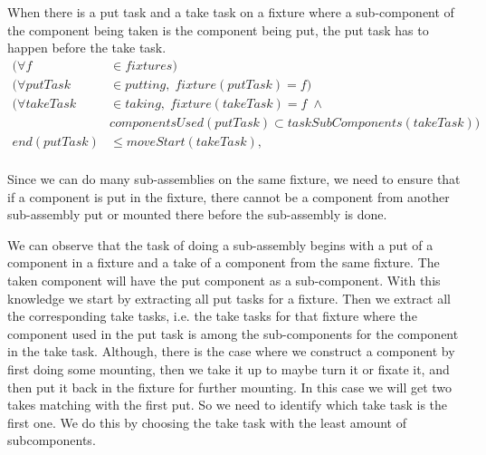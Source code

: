   \noindent When there is a put task and a take task on a fixture where a sub-component of the component being taken is the component being put, the put task has to happen before the take task.
 \begin{equation}
 \begin{aligned}\label{eq:99}
 (\forall f &\in fixtures) \\
 (\forall putTask &\in putting, \; fixture(putTask) = f)\\
 (\forall takeTask &\in taking, \; fixture(takeTask) = f \; \land \\
 &componentsUsed(putTask) \subset taskSubComponents(takeTask)) \\
 end(putTask) &\le moveStart(takeTask), \\
 \end{aligned}
 \end{equation}

  \noindent Since we can do many sub-assemblies on the same fixture, we need to ensure that if a component is put in the fixture, there cannot be a component from another sub-assembly put or mounted there before the sub-assembly is done.
  
  We can observe that the task of doing a sub-assembly begins with a put of a component in a fixture and a take of a component from the same fixture. The taken component will have the put component as a sub-component. With this knowledge we start by extracting all put tasks for a fixture. Then we extract all the corresponding take tasks, i.e. the take tasks for that fixture where the component used in the put task is among the sub-components for the component in the take task. Although, there is the case where we construct a component by first doing some mounting, then we take it up to maybe turn it or fixate it, and then put it back in the fixture for further mounting. In this case we will get two takes matching with the first put. So we need to identify which take task is the first one. We do this by choosing the take task with the least amount of subcomponents.
  
